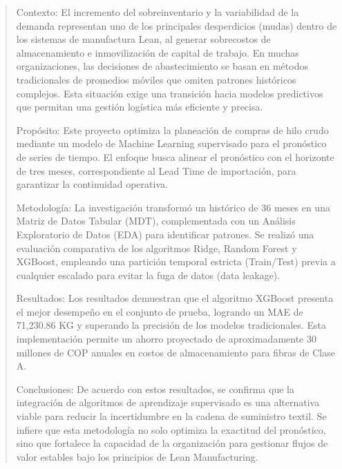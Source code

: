 \documentclass[conference,twoside]{IEEEtran}
\begin{document}
\maketitle
\thispagestyle{firstpage} %
\pagestyle{fancy}         %


\begin{abstract}
Contexto: El incremento del sobreinventario y la variabilidad de la demanda representan uno de los principales desperdicios (mudas) dentro de los sistemas de manufactura Lean, al generar sobrecostos de almacenamiento e inmovilización de capital de trabajo. En muchas organizaciones, las decisiones de abastecimiento se basan en métodos tradicionales de promedios móviles que omiten patrones históricos complejos. Esta situación exige una transición hacia modelos predictivos que permitan una gestión logística más eficiente y precisa.

Propósito: Este proyecto optimiza la planeación de compras de hilo crudo mediante un modelo de Machine Learning supervisado para el pronóstico de series de tiempo. El enfoque busca alinear el pronóstico con el horizonte de tres meses, correspondiente al Lead Time de importación, para garantizar la continuidad operativa.

Metodología: La investigación transformó un histórico de 36 meses en una Matriz de Datos Tabular (MDT), complementada con un Análisis Exploratorio de Datos (EDA) para identificar patrones. Se realizó una evaluación comparativa de los algoritmos Ridge, Random Forest y XGBoost, empleando una partición temporal estricta (Train/Test) previa a cualquier escalado para evitar la fuga de datos (data leakage).

Resultados: Los resultados demuestran que el algoritmo XGBoost presenta el mejor desempeño en el conjunto de prueba, logrando un MAE de 71,230.86 KG y superando la precisión de los modelos tradicionales. Esta implementación permite un ahorro proyectado de aproximadamente 30 millones de COP anuales en costos de almacenamiento para fibras de Clase A.

Conclusiones: De acuerdo con estos resultados, se confirma que la integración de algoritmos de aprendizaje supervisado es una alternativa viable para reducir la incertidumbre en la cadena de suministro textil. Se infiere que esta metodología no solo optimiza la exactitud del pronóstico, sino que fortalece la capacidad de la organización para gestionar flujos de valor estables bajo los principios de Lean Manufacturing.


\end{abstract}
\end{document}
